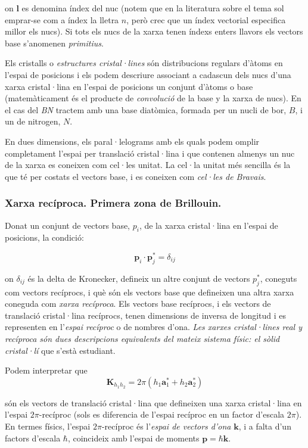 \documentclass[12pt]{article} %
\let\vec\mathbf %
\begin{document}
on $\vec l$ es denomina índex del nuc (notem que en la literatura sobre el tema sol emprar-se com a índex la lletra $n$, però crec que un índex vectorial especifica millor els nucs). Si tots els nucs de la xarxa tenen índexs enters llavors els vectors base s'anomenen \emph{primitius}.

Els cristalls o \emph{estructures cristal·lines} són distribucions regulars d'àtoms en l'espai de posicions i els podem descriure associant a cadascun dels nucs d'una xarxa cristal·lina en l'espai de posicions un conjunt d'àtoms o base (matemàticament és el producte de \emph{convolució} de la base y la xarxa de nucs). En el cas del \emph{BN} tractem amb una base diatòmica, formada per un nucli de bor, $B$, i un de nitrogen, $N$. 

En dues dimensions, els paral·lelograms amb els quals podem omplir completament l'espai per translació cristal·lina i que contenen almenys un nuc de la xarxa es coneixen com cel·les unitat. La cel·la unitat més sencilla és la que té per costats el vectors base, i es coneixen com \emph{cel·les de Bravais}.

\subsubsection{Xarxa recíproca. Primera zona de Brillouin.}
Donat un conjunt de vectors base, $p_i$, de la xarxa cristal·lina en l'espai de posicions, la condició:

\begin{equation}
\label{eq:rec1}
\vec p_i\cdot\vec p_j^{*}=\delta_{ij}
\end{equation}

on $\delta_{ij}$ és la delta de Kronecker, defineix un altre conjunt de vectors $p_j^*$, coneguts com vectors recíprocs, i què són els vectors base que defineixen una altra xarxa coneguda com \textit{xarxa recíproca}. Els  vectors base recíprocs, i els vectors de translació cristal·lina recíprocs, tenen dimensions de inversa de longitud i es representen en l'\textit{espai recíproc} o de nombres d'ona. \textit{Les xarxes cristal·lines real y recíproca són dues descripcions equivalents del mateix sistema físic: el sòlid cristal·lí} que s'està estudiant.

Podem interpretar que
\begin{equation}
\label{eq:rec3}
\vec K_{h_1h_2}=2\pi\left(h_1\vec a_1^{*}+h_2\vec a_2^{*}\right)
\end{equation}

són els vectors de translació cristal·lina que defineixen una xarxa cristal·lina en l'espai $2\pi$-recíproc (sols es diferencia de l'espai recíproc en un factor d'escala $2\pi$). En termes físics, l'espai $2\pi$-recíproc és l'\emph{espai de vectors d'ona} $\vec k$, i a falta d'un factors d'escala $\hbar$, coincideix amb l'espai de moments  $\vec p=\hbar\vec k$.
\end{document}
